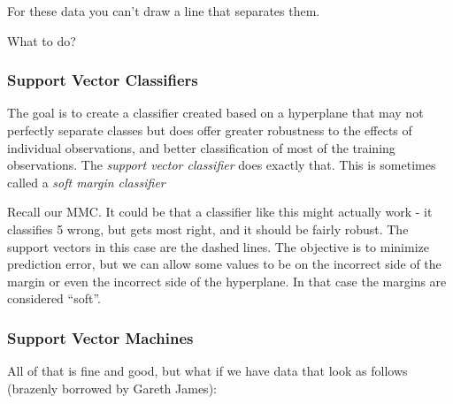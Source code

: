 \documentclass[
]{article}
\begin{document}
For these data you can't draw a line that separates them.

What to do?

\hypertarget{support-vector-classifiers}{%
\subsubsection{Support Vector
Classifiers}\label{support-vector-classifiers}}

The goal is to create a classifier created based on a hyperplane that
may not perfectly separate classes but does offer greater robustness to
the effects of individual observations, and better classification of
most of the training observations. The \emph{support vector classifier}
does exactly that. This is sometimes called a \emph{soft margin
classifier}

Recall our MMC. It could be that a classifier like this might actually
work - it classifies 5 wrong, but gets most right, and it should be
fairly robust. The support vectors in this case are the dashed lines.
The objective is to minimize prediction error, but we can allow some
values to be on the incorrect side of the margin or even the incorrect
side of the hyperplane. In that case the margins are considered
``soft''.

\hypertarget{support-vector-machines}{%
\subsubsection{Support Vector Machines}\label{support-vector-machines}}

All of that is fine and good, but what if we have data that look as
follows (brazenly borrowed by Gareth James):
\end{document}
